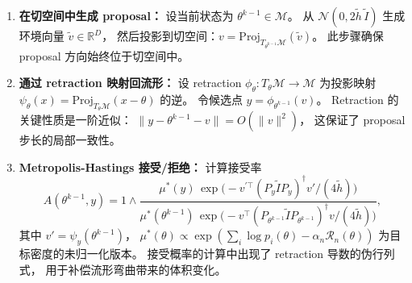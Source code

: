\begin{enumerate}
    \item \textbf{在切空间中生成 proposal：}
          设当前状态为 $\theta^{k-1}\in\mathcal{M}$。
          从 $\mathcal{N}(0,2\widetilde{h}\,\widetilde{I})$ 生成环境向量 $\widetilde{v}\in\mathbb{R}^D$，
          然后投影到切空间：$v=\mathrm{Proj}_{T_{\theta^{k-1}}\mathcal{M}}(\widetilde{v})$。
          此步骤确保 proposal 方向始终位于切空间中。

    \item \textbf{通过 retraction 映射回流形：}
          设 retraction $\phi_\theta:T_\theta\mathcal{M}\to\mathcal{M}$
          为投影映射 $\psi_\theta(x)=\mathrm{Proj}_{T_\theta\mathcal{M}}(x-\theta)$ 的逆。
          令候选点 $y=\phi_{\theta^{k-1}}(v)$。
          Retraction 的关键性质是一阶近似：
          $\|y-\theta^{k-1}-v\|=O(\|v\|^2)$，
          这保证了 proposal 步长的局部一致性。

    \item \textbf{Metropolis-Hastings 接受/拒绝：}
          计算接受率
          \begin{equation}\label{eq:ch1-rrwm-accept}
          A(\theta^{k-1},y)
          = 1\wedge\frac{\mu^*(y)\,\exp\!\big(-v^{\prime\top}(P_y\widetilde{I}P_y)^\dagger v'/(4\widetilde{h})\big)}
                         {\mu^*(\theta^{k-1})\,\exp\!\big(-v^\top(P_{\theta^{k-1}}\widetilde{I}P_{\theta^{k-1}})^\dagger v/(4\widetilde{h})\big)},
          \end{equation}
          其中 $v'=\psi_y(\theta^{k-1})$，
          $\mu^*(\theta)\propto\exp(\sum_i\log p_i(\theta)-\alpha_n\mathcal{R}_n(\theta))$
          为目标密度的未归一化版本。
          接受概率的计算中出现了 retraction 导数的伪行列式，
          用于补偿流形弯曲带来的体积变化。

\end{enumerate}

